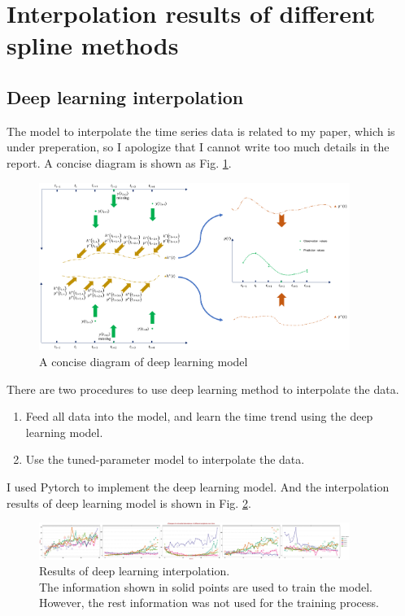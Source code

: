 \documentclass[a4 paper]{article}
\begin{document}
\section{Interpolation results of different spline methods}

\subsection{Deep learning interpolation}\label{sec3}

The model to interpolate the time series data is related to my paper, which is under preperation, so I apologize that I cannot write too much details in the report. A concise diagram is shown as Fig. \ref{diagram}.

\begin{figure}[ht]
    \centering
    \includegraphics[width=0.9\textwidth]{picture/gruode_model.pdf}
    \caption{A concise diagram of deep learning model}
    \label{diagram}
    \end{figure}

There are two procedures to use deep learning method to interpolate the data.

\begin{enumerate}
    \item Feed all data into the model, and learn the time trend using the deep learning model.
    \item Use the tuned-parameter model to interpolate the data.
\end{enumerate}

I used Pytorch\cite{NEURIPS2019_9015} to implement the deep learning model. And the interpolation results of deep learning model is shown in Fig. \ref{dl}.

\begin{figure}[ht]
    \centering
    \includegraphics[width=0.9\textwidth]{figure/DL_spline.pdf}
    \caption{Results of deep learning interpolation.\\The information shown in solid points are used to train the model. However, the rest information was not used for the training process.}
    \label{dl}
\end{figure}
\end{document}
